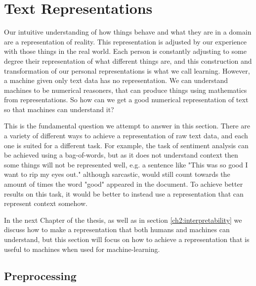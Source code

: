 








\section{Text Representations}\label{ch2:representations}


Our intuitive understanding of how things behave and what they are in a domain are a representation of reality. This representation is adjusted by our experience with those things in the real world. Each person is constantly adjusting to some degree their representation of what different things are, and this construction and transformation of our personal representations is what we call learning. However, a machine given only text data has no representation. We can understand machines to be numerical reasoners, that can produce things using mathematics from representations. So how can we get a good numerical representation of text so that machines can understand it?

This is the fundamental question we attempt to answer in this section. There are a variety of different ways to achieve a representation of raw text data, and each one is suited for a different task. For example, the task of sentiment analysis can be achieved using a bag-of-words, but as it does not understand context then some things will not be represented well, e.g. a sentence like "This was so good I want to rip my eyes out." although sarcastic, would still count towards the amount of times the word "good" appeared in the document. To achieve better results on this task, it would be better to instead use a representation that can represent context somehow.

In the next Chapter of the thesis, as well as in section \ref{ch2:interpretability} we discuss how to make a representation that both humans and machines can understand, but this section will focus on how to achieve a representation that is useful to machines when used for machine-learning.


\subsection{Preprocessing}\label{ch2:data}

